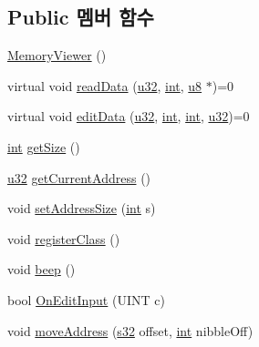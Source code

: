 \subsection*{Public 멤버 함수}
\begin{DoxyCompactItemize}
\item 
\mbox{\hyperlink{class_memory_viewer_abb2fe8dcb2bfbf02b714dacc3d46cc55}{Memory\+Viewer}} ()
\item 
virtual void \mbox{\hyperlink{class_memory_viewer_a2e1b969cce8f4d60912f6b640febc54a}{read\+Data}} (\mbox{\hyperlink{_system_8h_a10e94b422ef0c20dcdec20d31a1f5049}{u32}}, \mbox{\hyperlink{_util_8cpp_a0ef32aa8672df19503a49fab2d0c8071}{int}}, \mbox{\hyperlink{_system_8h_aed742c436da53c1080638ce6ef7d13de}{u8}} $\ast$)=0
\item 
virtual void \mbox{\hyperlink{class_memory_viewer_a07778cf336e9f145a6403849407fb72d}{edit\+Data}} (\mbox{\hyperlink{_system_8h_a10e94b422ef0c20dcdec20d31a1f5049}{u32}}, \mbox{\hyperlink{_util_8cpp_a0ef32aa8672df19503a49fab2d0c8071}{int}}, \mbox{\hyperlink{_util_8cpp_a0ef32aa8672df19503a49fab2d0c8071}{int}}, \mbox{\hyperlink{_system_8h_a10e94b422ef0c20dcdec20d31a1f5049}{u32}})=0
\item 
\mbox{\hyperlink{_util_8cpp_a0ef32aa8672df19503a49fab2d0c8071}{int}} \mbox{\hyperlink{class_memory_viewer_a288ec6d61ae8687974786bf8d04a4e77}{get\+Size}} ()
\item 
\mbox{\hyperlink{_system_8h_a10e94b422ef0c20dcdec20d31a1f5049}{u32}} \mbox{\hyperlink{class_memory_viewer_a7c3931c2a0b1247e4a093a1688d443bf}{get\+Current\+Address}} ()
\item 
void \mbox{\hyperlink{class_memory_viewer_a64938573e15f4d5b31eea26dc6788d0e}{set\+Address\+Size}} (\mbox{\hyperlink{_util_8cpp_a0ef32aa8672df19503a49fab2d0c8071}{int}} s)
\item 
void \mbox{\hyperlink{class_memory_viewer_af3d30272c691967ea6a4cc37ceb87595}{register\+Class}} ()
\item 
void \mbox{\hyperlink{class_memory_viewer_a32096a7542505dd4c2b94b9a1f715ae9}{beep}} ()
\item 
bool \mbox{\hyperlink{class_memory_viewer_ab3cf8e1e2318a15b1e7c783b9a7bad80}{On\+Edit\+Input}} (U\+I\+NT c)
\item 
void \mbox{\hyperlink{class_memory_viewer_a0a371c925fc00dd78fedd8d21ebc8cdc}{move\+Address}} (\mbox{\hyperlink{_system_8h_a0ce6887c26c1c49ad3be5710dd42bfd6}{s32}} offset, \mbox{\hyperlink{_util_8cpp_a0ef32aa8672df19503a49fab2d0c8071}{int}} nibble\+Off)
\item 

\end{DoxyCompactItemize}
